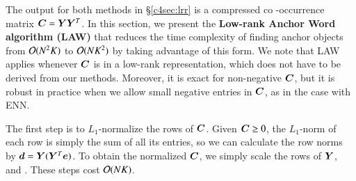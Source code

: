 The output for both methods in \S \ref{c4sec:lrr} is a compressed co
\hyp{}occurrence matrix $\bm{C} \mathrel{=} \bm{Y}\bm{Y}^T$. In this section, we present the 
\textbf{Low-rank Anchor Word algorithm (LAW)} that reduces the time complexity
of finding anchor objects from $\mathcal{O}(N^2K)$ to $\mathcal{O}(NK^2)$ by taking
advantage of this form. We note that LAW applies whenever $\bm{C}$ is in a low-rank
representation, which does not have to be derived from our methods. Moreover, it
is exact for non-negative $\bm{C}$, but it is robust in practice when we allow
small negative entries in $\bm{C}$, as in the case with ENN.

The first step is to $L_1$\hyp{}normalize the rows of $\bm{C}$. Given $\bm{C} \mathrel{\geq} 0$,
the $L_1$\hyp{}norm of each row is simply the sum of all its entries, so we can
calculate the row norms by $\bm{d} \mathrel{=} \bm{Y}(\bm{Y}^T\bm{e})$. To obtain the normalized
$\bm{C}$, we simply scale the rows of $\bm{Y}$, and . These steps cost $\mathcal{O}(NK)$.

